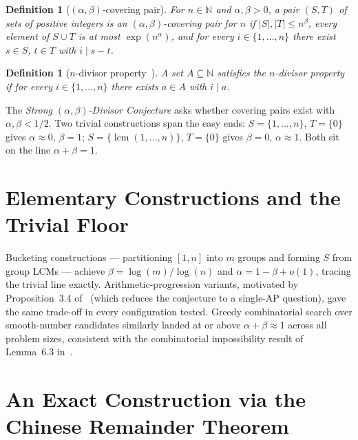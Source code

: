 \documentclass[12pt]{article}
\newtheorem{definition}[theorem]{Definition}
\theoremstyle{remark}
\newcommand{\N}{\mathbb{N}}
\DeclareMathOperator{\lcm}{lcm}
\begin{document}
\begin{definition}[$(\alpha,\beta)$-covering pair]
For $n \in \N$ and $\alpha,\beta > 0$, a pair $(S,T)$ of sets of positive
integers is an \emph{$(\alpha,\beta)$-covering pair for $n$} if $|S|, |T| \le
n^{\beta}$, every element of $S \cup T$ is at most $\exp(n^{\alpha})$, and for
every $i \in \{1,\ldots,n\}$ there exist $s \in S$, $t \in T$ with $i \mid s -
t$.
\end{definition}

\begin{definition}[$n$-divisor property~{\cite[Def.~3.1]{umans2025}}]
A set $A \subseteq \N$ satisfies the \emph{$n$-divisor property} if for every
$i \in \{1,\ldots,n\}$ there exists $a \in A$ with $i \mid a$.
\end{definition}

The \emph{Strong $(\alpha,\beta)$-Divisor Conjecture} asks whether covering
pairs exist with $\alpha,\beta < 1/2$.  Two trivial constructions span the easy
ends: $S = \{1,\ldots,n\}$, $T = \{0\}$ gives $\alpha \approx 0$, $\beta = 1$;
$S = \{\lcm(1,\ldots,n)\}$, $T = \{0\}$ gives $\beta = 0$, $\alpha \approx 1$.
Both sit on the line $\alpha + \beta = 1$.

\section{Elementary Constructions and the Trivial Floor}

Bucketing constructions --- partitioning $[1,n]$ into $m$ groups and forming
$S$ from group LCMs --- achieve $\beta = \log(m)/\log(n)$ and $\alpha = 1 -
\beta + o(1)$, tracing the trivial line exactly.  Arithmetic-progression
variants, motivated by Proposition~3.4 of~\cite{umans2025} (which reduces the
conjecture to a single-AP question), gave the same trade-off in every
configuration tested.  Greedy combinatorial search over smooth-number candidates
similarly landed at or above $\alpha + \beta \approx 1$ across all problem
sizes, consistent with the combinatorial impossibility result of
Lemma~6.3 in~\cite{umans2025}.

\section{An Exact Construction via the Chinese Remainder Theorem}
\end{document}
